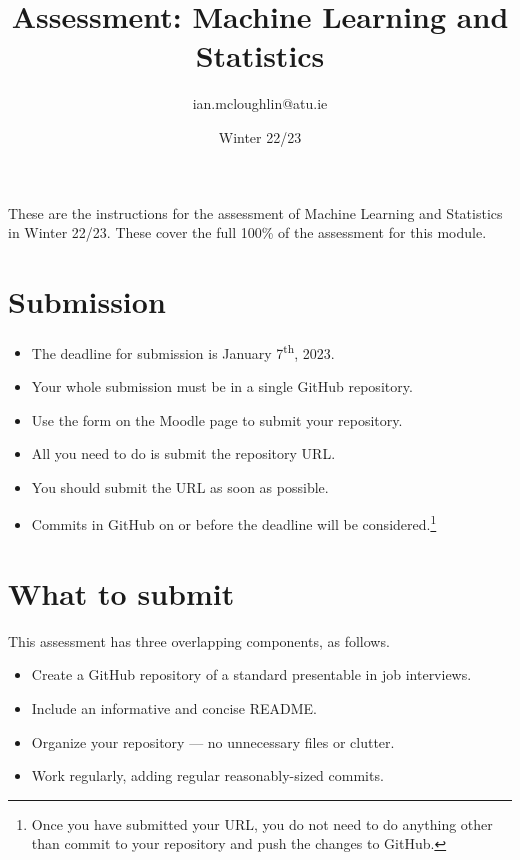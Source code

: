 \documentclass[a4paper]{tufte-handout}
\title{Assessment: Machine Learning and Statistics}
\author{ian.mcloughlin@atu.ie}
\date{Winter 22/23}
\begin{document}
 
\maketitle

These are the instructions for the assessment of Machine Learning and Statistics in Winter 22/23.
These cover the full 100\% of the assessment for this module.


\section{Submission}

\begin{itemize}
  \item The deadline for submission is January 7\textsuperscript{th}, 2023. 
  \item Your whole submission must be in a single GitHub repository.
  \item Use the form on the Moodle page to submit your repository.
  \item All you need to do is submit the repository URL.
  \item You should submit the URL as soon as possible.
  \item Commits in GitHub on or before the deadline will be considered.\footnote{Once you have submitted your URL, you do not need to do anything other than commit to your repository and push the changes to GitHub.}
\end{itemize}


\section{What to submit}
This assessment has three overlapping components, as follows.

\begin{itemize}
  \item Create a GitHub repository of a standard presentable in job interviews.
  \item Include an informative and concise README.
  \item Organize your repository --- no unnecessary files or clutter.
  \item Work regularly, adding regular reasonably-sized commits.
\end{itemize}
\end{document}
